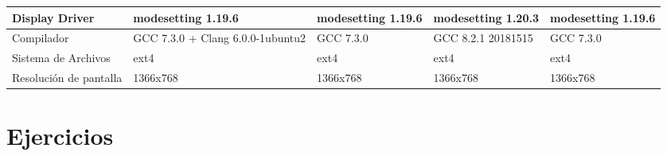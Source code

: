 \documentclass{article}
\begin{document}
\begin{table}[H]
\begin{tabularx}{\linewidth}{|L|L|L|L|L|}
Display Driver         & modesetting 1.19.6                                     & modesetting 1.19.6                                          & modesetting 1.20.3                                                     & modesetting 1.19.6                                       \\ \hline
{}Compilador             & GCC 7.3.0 + Clang 6.0.0-1ubuntu2                       & GCC 7.3.0                                                   & GCC 8.2.1 20181515                                                     & GCC 7.3.0                                                \\ \hline
{}Sistema de Archivos    & ext4                                                   & ext4                                                        & ext4                                                                   & ext4                                                     \\ \hline
{}Resolución de pantalla & 1366x768                                               & 1366x768                                                    & 1366x768                                                               & 1366x768                                                 \\ \hline
\end{tabularx}
\end{table}

    \section{Ejercicios}
\end{document}
